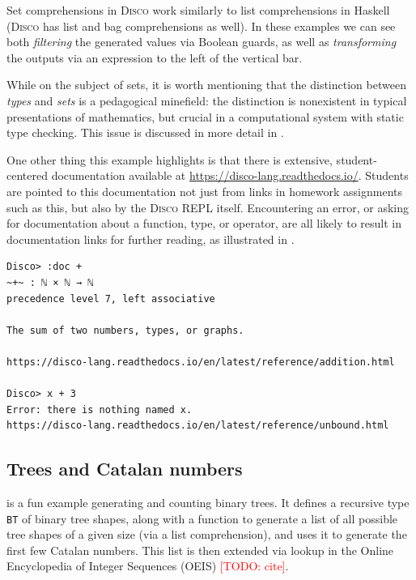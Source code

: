 \documentclass[submission,copyright,creativecommons]{eptcs}
\newcommand{\disco}{\textsc{Disco}\xspace}
\newcommand{\pref}[1]{\prettyref{#1}}
\newcommand{\todo}[1]{\textcolor{red}{[TODO: #1]}}
\newcommand{\todo}[1]{}
\begin{document}
Set comprehensions in \disco work similarly to list comprehensions in
Haskell (\disco has list and bag comprehensions as well).  In
these examples we can see both \emph{filtering} the generated values via
Boolean guards, as well as \emph{transforming} the outputs via an
expression to the left of the vertical bar.

While on the subject of sets, it is worth mentioning that the
distinction between \emph{types} and \emph{sets} is a pedagogical
minefield: the distinction is nonexistent in typical presentations of
mathematics, but crucial in a computational system with static type
checking.  This issue is discussed in more detail in
\pref{sec:typesvsets}.

One other thing this example highlights is that there is extensive,
student-centered documentation available at
\url{https://disco-lang.readthedocs.io/}.  Students are pointed to
this documentation not just from links in homework assignments such as
this, but also by the \disco REPL itself. Encountering an error, or
asking for documentation about a function, type, or operator, are
all likely to result in documentation links for further reading, as
illustrated in \pref{lst:doc}.

\begin{listing}[!htp]
\begin{verbatim}
Disco> :doc +
~+~ : ℕ × ℕ → ℕ
precedence level 7, left associative

The sum of two numbers, types, or graphs.

https://disco-lang.readthedocs.io/en/latest/reference/addition.html

Disco> x + 3
Error: there is nothing named x.
https://disco-lang.readthedocs.io/en/latest/reference/unbound.html
\end{verbatim}
\caption{\disco generates links to online documentation}
\label{lst:doc}
\end{listing}

\subsection{Trees and Catalan numbers}

\pref{lst:catalan} is a fun example generating and counting binary
trees. It defines a recursive type \texttt{BT} of binary tree shapes,
along with a function to generate a list of all possible tree shapes
of a given size (via a list comprehension), and uses it to generate
the first few Catalan numbers.  This list is then extended via lookup
in the Online Encyclopedia of Integer Sequences (OEIS) \todo{cite}.
\end{document}
